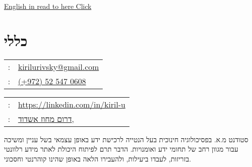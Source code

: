 \setRTL
\hspace{.25\textwidth}
\begin{minipage}[t]{.5\textwidth}
	\par{\par}
\end{minipage}

 \begin{minipage}[t]{1.0\textwidth}
	{\footnotesize\hfill{}\color{gray}
		\hfill{}\hyperref[sec:basicinfo-eng]{English in read to here Click}	
	}
 \end{minipage}
\section{כללי}
\label{basicinfo-heb}
\unsetRTL
\setLTR
\begin{minipage}[t]{.5\linewidth}
	\begin{tabular}{rp{.75\linewidth}}
		\baselineskip=20pt
		\email{} : &\href{mailto:kirilurivsky@gmail.com}{kirilurivsky@gmail.com}\\
		\phone{} : &\href{tel:972525470608}{(+972) 52 547 0608}
	\end{tabular}
\end{minipage}
\begin{minipage}[t]{.5\linewidth}
	\begin{tabular}{rl}
		\linkedin{} : &\href{https://www.linkedin.com/in/kiril-u}{https://linkedin.com/in/kiril-u}\\
		\location{} : &\href{https://goo.gl/maps/MSacjpSy7vZSKykP7}{דרום מחוז אשדוד,}
	\end{tabular}
\end{minipage}	
\unsetLTR
\unsetRTL
\setRTL
\begin{minipage}[t]{1\linewidth}
	\vspace{0.25cm} %
סטודנט מ.א. בפסיכולוגיה חינוכית בעל הנטייה לרכישת ידע באופן עצמאי בשל עניין ומשיכה עבור מגוון רחב של תחומי ידע ואומנויות. הדבר תרם לפיתוח היכולת לאתר מידע רלוונטי בזריזות, לעבדו ביעילות, ולהעבירו הלאה באופן שהינו קוהרנטי וחסכוני. 
\end{minipage}

%


